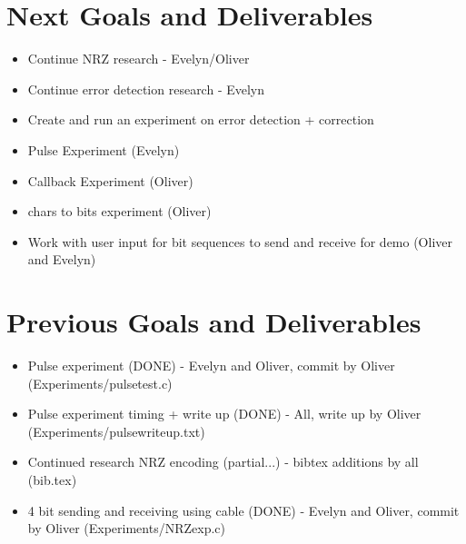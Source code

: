 \documentclass{article}
\begin{document}
\section*{Next Goals and Deliverables}
\begin{itemize}
\item Continue NRZ research - Evelyn/Oliver
\item Continue error detection research - Evelyn
\item Create and run an experiment on error detection + correction
\item Pulse Experiment (Evelyn)
\item Callback Experiment (Oliver)
\item chars to bits experiment (Oliver)
\item Work with user input for bit sequences to send and receive for demo (Oliver and Evelyn)
\end{itemize}
\section*{Previous Goals and Deliverables}
\begin{itemize}
\item Pulse experiment (DONE) - Evelyn and Oliver, commit by Oliver (Experiments/pulsetest.c)
\item Pulse experiment timing + write up (DONE) - All, write up by Oliver (Experiments/pulsewriteup.txt)
\item Continued research NRZ encoding (partial...) - bibtex additions by all (bib.tex)
\item 4 bit sending and receiving using cable (DONE) - Evelyn and Oliver, commit by Oliver (Experiments/NRZexp.c)
\end{itemize}
\end{document}
